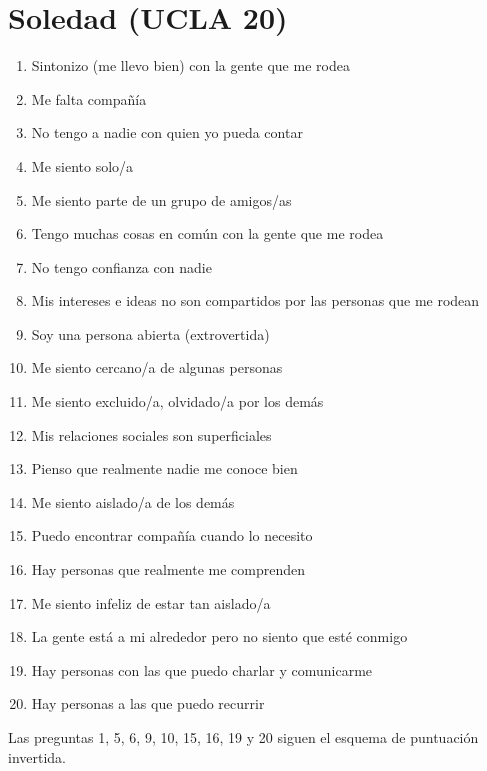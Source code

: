     \section{Soledad (UCLA 20)}
        \label{cuestionarios:ucla_20}
        \begin{enumerate}
            \item Sintonizo (me llevo bien) con la gente que me rodea
            \item Me falta compañía
            \item No tengo a nadie con quien yo pueda contar
            \item Me siento solo/a
            \item Me siento parte de un grupo de amigos/as
            \item Tengo muchas cosas en común con la gente que me rodea
            \item No tengo confianza con nadie
            \item Mis intereses e ideas no son compartidos por las personas que me rodean
            \item Soy una persona abierta (extrovertida)
            \item Me siento cercano/a de algunas personas
            \item Me siento excluido/a, olvidado/a por los demás
            \item Mis relaciones sociales son superficiales
            \item Pienso que realmente nadie me conoce bien
            \item Me siento aislado/a de los demás
            \item Puedo encontrar compañía cuando lo necesito
            \item Hay personas que realmente me comprenden
            \item Me siento infeliz de estar tan aislado/a
            \item La gente está a mi alrededor pero no siento que esté conmigo
            \item Hay personas con las que puedo charlar y comunicarme
            \item Hay personas a las que puedo recurrir
        \end{enumerate}

        Las preguntas 1, 5, 6, 9, 10, 15, 16, 19 y 20 siguen el esquema de puntuación invertida.
        
